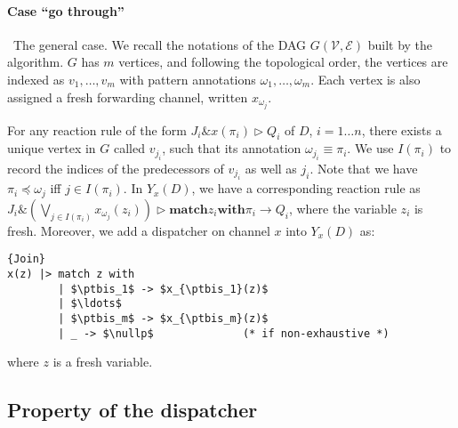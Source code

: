 \documentclass{LMCS}
\newcommand{\pt}{\pi}
\newcommand{\ptbis}{\omega}
\newcommand{\kwd}[1]{\ensuremath{\mathbf{#1}}}
\newcommand{\prefix}[1]{\mathopen{}\mathrel{\kwd {#1}}}
\newcommand{\infix}[1]{\mathrel{\kwd {#1}}}
\renewcommand{\_}{\mathord{\rule[-.25ex]{1ex}{.15ex}}}
\newcommand{\V}{\mathcal{V}}
\newcommand{\E}{\mathcal{E}}
\newcommand{\nullp}{0}
\newcommand{\para}[2]{#1\mathop{\&}#2}
\newcommand{\matchone}[3]{\prefix{match} #1 \infix{with} #2
  \rightarrow #3}
\newcommand{\reaction}[2]{#1 \triangleright #2}
\newcommand{\preds}[1]{I(#1)}
\begin{document}
\paragraph{\bf Case ``go through''}\ The general case. We recall the notations
  of the DAG $G(\V,\E)$ built by the algorithm. $G$ has $m$ vertices,
  and following the topological order, the vertices are indexed as
  $v_1, \ldots, v_m$ with pattern annotations $\ptbis_1, \ldots,
  \ptbis_m$.  Each vertex is
  also assigned a fresh forwarding channel, written $x_{\ptbis_j}$.
  
  For any reaction rule of the form
  $\reaction{\para{J_i}{x(\pt_i)}}{Q_i}$ of $D$, $i=1\ldots n$, there
  exists a unique vertex in $G$ called $v_{j_{i}}$, such that its
  annotation $\ptbis_{j_{i}} \equiv \pt_i$. We use $\preds{\pt_i}$
  to record the indices of the predecessors of $v_{j_{i}}$ as well as
  $j_i$. Note that we have $\pt_i \preceq \ptbis_j$ iff
  $j\in\preds{\pt_i}$. In $Y_x(D)$, we have a corresponding reaction
  rule as $
  \reaction{\para{J_i}{(\displaystyle\bigvee_{j\in\preds{\pt_i}}x_{\ptbis_j}(z_i))}}
  {\matchone{z_i}{\pt_i}{Q_i}} $, where the variable $z_i$ is fresh.
  Moreover, we add a dispatcher on channel $x$ into $Y_x(D)$ as:
\begin{lstlisting}{Join}
x(z) |> match z with
        | $\ptbis_1$ -> $x_{\ptbis_1}(z)$
        | $\ldots$
        | $\ptbis_m$ -> $x_{\ptbis_m}(z)$
        | _ -> $\nullp$              (* if non-exhaustive *) 
\end{lstlisting}
where $z$ is a fresh variable.


\subsection{Property of the dispatcher}
\label{subsec.dispatcher}
\end{document}
